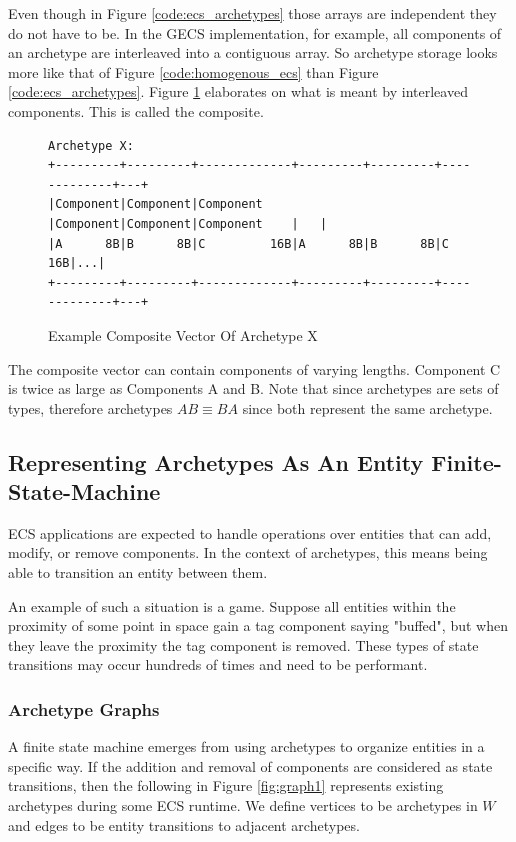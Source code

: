 Even though in Figure \ref{code:ecs_archetypes} those arrays are independent they do not have to be. In the GECS implementation, for example, all components of an archetype are interleaved into a contiguous array. So archetype storage looks more like that of Figure \ref{code:homogenous_ecs} than Figure \ref{code:ecs_archetypes}. Figure \ref{fig:composite} elaborates on what is meant by interleaved components. This is called the composite.


\begin{figure}[htbp]
    \centering
    \begin{verbatim}
Archetype X:                                                             
+---------+---------+-------------+---------+---------+-------------+---+
|Component|Component|Component    |Component|Component|Component    |   |
|A      8B|B      8B|C         16B|A      8B|B      8B|C         16B|...|
+---------+---------+-------------+---------+---------+-------------+---+
    \end{verbatim}
    \caption{Example Composite Vector Of Archetype X}
    \label{fig:composite}
\end{figure}

The composite vector can contain components of varying lengths. Component C is twice as large as Components A and B. Note that since archetypes are sets of types, therefore archetypes $AB \equiv BA$ since both represent the same archetype.

\subsection{Representing Archetypes As An Entity Finite-State-Machine}
\label{sec:fsm_arc}
ECS applications are expected to handle operations over entities that can add, modify, or remove components. In the context of archetypes, this means being able to transition an entity between them. 

An example of such a situation is a game. Suppose all entities within the proximity of some point in space gain a tag component saying "buffed", but when they leave the proximity the tag component is removed. These types of state transitions may occur hundreds of times and need to be performant. 

\subsubsection{Archetype Graphs}

A finite state machine emerges from using archetypes to organize entities in a specific way. If the addition and removal of components are considered as state transitions, then the following in Figure \ref{fig:graph1} represents existing archetypes during some ECS runtime. We define vertices to be archetypes in $W$ and edges to be entity transitions to adjacent archetypes.

